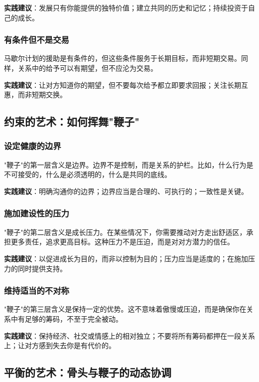 \documentclass[12pt,a4paper]{article}
\begin{document}
\textbf{实践建议}：发展只有你能提供的独特价值；建立共同的历史和记忆；持续投资于自己的成长。

\subsubsection{有条件但不是交易}

马歇尔计划的援助是有条件的，但这些条件服务于长期目标，而非短期交易。同样，关系中的给予可以有期望，但不应沦为交易。

\textbf{实践建议}：让对方知道你的期望，但不要每次给予都立即要求回报；关注长期互惠，而非短期交换。

\subsection{约束的艺术：如何挥舞"鞭子"}

\subsubsection{设定健康的边界}

"鞭子"的第一层含义是边界。边界不是控制，而是关系的护栏。比如，什么行为是不可接受的，什么是必须透明的，什么是共同的底线。

\textbf{实践建议}：明确沟通你的边界；边界应当是合理的、可执行的；一致性是关键。

\subsubsection{施加建设性的压力}

"鞭子"的第二层含义是成长压力。在某些情况下，你需要推动对方走出舒适区，承担更多责任，追求更高目标。这种压力不是压迫，而是对对方潜力的信任。

\textbf{实践建议}：以促进成长为目的，而非以控制为目的；压力应当是适度的；在施加压力的同时提供支持。

\subsubsection{维持适当的不对称}

"鞭子"的第三层含义是保持一定的优势。这不意味着傲慢或压迫，而是确保你在关系中有足够的筹码，不至于完全被动。

\textbf{实践建议}：保持经济、社交或情感上的相对独立；不要将所有筹码都押在一段关系上；让对方感到失去你是有代价的。

\subsection{平衡的艺术：骨头与鞭子的动态协调}
\end{document}
